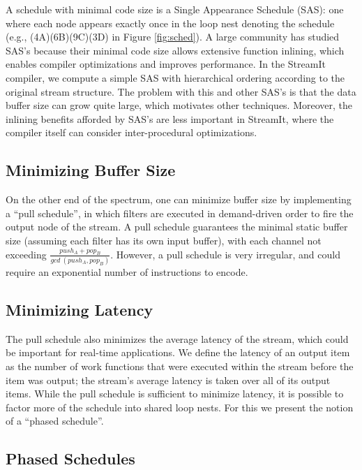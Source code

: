 A schedule with minimal code size is a Single Appearance Schedule
(SAS): one where each node appears exactly once in the loop nest
denoting the schedule (e.g., (4A)(6B)(9C)(3D) in Figure
\ref{fig:sched}).  A large community \cite{ptolemy} has studied SAS's
because their minimal code size allows extensive function inlining,
which enables compiler optimizations and improves performance.  In the
StreamIt compiler, we compute a simple SAS with hierarchical ordering
according to the original stream structure.  The problem with this and
other SAS's is that the data buffer size can grow quite large, which
motivates other techniques.  Moreover, the inlining benefits afforded
by SAS's are less important in StreamIt, where the compiler itself can
consider inter-procedural optimizations.

\subsection{Minimizing Buffer Size}

On the other end of the spectrum, one can minimize buffer size by
implementing a ``pull schedule'', in which filters are executed in
demand-driven order to fire the output node of the stream.  A pull
schedule guarantees the minimal static buffer size (assuming each
filter has its own input buffer), with each channel not exceeding
$\frac{push_A + pop_B}{gcd~(push_A, pop_B)}$.  However, a pull
schedule is very irregular, and could require an exponential number of
instructions to encode.

\subsection{Minimizing Latency}

The pull schedule also minimizes the average latency of the stream,
which could be important for real-time applications.  We define the
latency of an output item as the number of work functions that were
executed within the stream before the item was output; the stream's
average latency is taken over all of its output items.  While the pull
schedule is sufficient to minimize latency, it is possible to factor
more of the schedule into shared loop nests.  For this we present the
notion of a ``phased schedule''.

\subsection{Phased Schedules}

